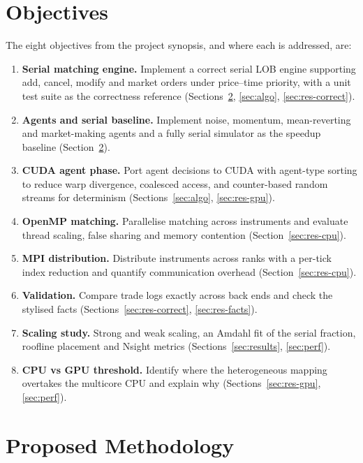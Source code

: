 \section{Objectives}\label{sec:obj}
The eight objectives from the project synopsis, and where each is addressed, are:
\begin{enumerate}
\item \textbf{Serial matching engine.} Implement a correct serial LOB engine supporting add,
  cancel, modify and market orders under price--time priority, with a unit test suite as the
  correctness reference (Sections~\ref{sec:method}, \ref{sec:algo}, \ref{sec:res-correct}).
\item \textbf{Agents and serial baseline.} Implement noise, momentum, mean-reverting and
  market-making agents and a fully serial simulator as the speedup baseline
  (Section~\ref{sec:method}).
\item \textbf{CUDA agent phase.} Port agent decisions to CUDA with agent-type sorting to reduce warp
  divergence, coalesced access, and counter-based random streams for determinism
  (Sections~\ref{sec:algo}, \ref{sec:res-gpu}).
\item \textbf{OpenMP matching.} Parallelise matching across instruments and evaluate thread scaling,
  false sharing and memory contention (Section~\ref{sec:res-cpu}).
\item \textbf{MPI distribution.} Distribute instruments across ranks with a per-tick index reduction
  and quantify communication overhead (Section~\ref{sec:res-cpu}).
\item \textbf{Validation.} Compare trade logs exactly across back ends and check the stylised facts
  (Sections~\ref{sec:res-correct}, \ref{sec:res-facts}).
\item \textbf{Scaling study.} Strong and weak scaling, an Amdahl fit of the serial fraction,
  roofline placement and Nsight metrics (Sections~\ref{sec:results}, \ref{sec:perf}).
\item \textbf{CPU vs GPU threshold.} Identify where the heterogeneous mapping overtakes the
  multicore CPU and explain why (Sections~\ref{sec:res-gpu}, \ref{sec:perf}).
\end{enumerate}

\section{Proposed Methodology}\label{sec:method}

